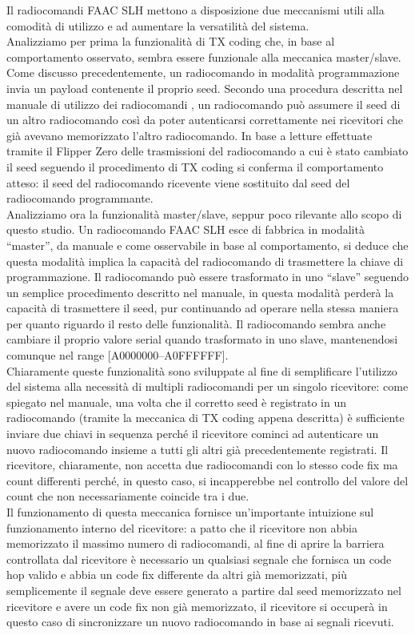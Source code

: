 Il radiocomandi FAAC SLH mettono a disposizione due meccanismi utili alla comodità di utilizzo e ad aumentare la versatilità del sistema.\\
Analizziamo per prima la funzionalità di TX coding che, in base al comportamento osservato, sembra essere funzionale alla meccanica master/slave. Come discusso precedentemente, un radiocomando in modalità programmazione invia un payload contenente il proprio seed. Secondo una procedura descritta nel manuale di utilizzo dei radiocomandi \cite{man1,man2}, un radiocomando può assumere il seed di un altro radiocomando così da poter autenticarsi correttamente nei ricevitori che già avevano memorizzato l’altro radiocomando. In base a letture effettuate tramite il Flipper Zero delle trasmissioni del radiocomando a cui è stato cambiato il seed seguendo il procedimento di TX coding si conferma il comportamento atteso: il seed del radiocomando ricevente viene sostituito dal seed del radiocomando programmante.\\
Analizziamo ora la funzionalità master/slave, seppur poco rilevante allo scopo di questo studio. Un radiocomando FAAC SLH esce di fabbrica in modalità “master”, da manuale \cite{man1} e come osservabile in base al comportamento, si deduce che questa modalità implica la capacità del radiocomando di trasmettere la chiave di programmazione. Il radiocomando può essere trasformato in uno “slave” seguendo un semplice procedimento descritto nel manuale, in questa modalità perderà la capacità di trasmettere il seed, pur continuando ad operare nella stessa maniera per quanto riguardo il resto delle funzionalità. Il radiocomando sembra anche cambiare il proprio valore serial quando trasformato in uno slave, mantenendosi comunque nel range [A0000000--A0FFFFFF].\\
Chiaramente queste funzionalità sono sviluppate al fine di semplificare l’utilizzo del sistema alla necessità di multipli radiocomandi per un singolo ricevitore: come spiegato nel manuale, una volta che il corretto seed è registrato in un radiocomando (tramite la meccanica di TX coding appena descritta) è sufficiente inviare due chiavi in sequenza perché il ricevitore cominci ad autenticare un nuovo radiocomando insieme a tutti gli altri già precedentemente registrati. Il ricevitore, chiaramente, non accetta due radiocomandi con lo stesso code fix ma count differenti perché, in questo caso, si incapperebbe nel controllo del valore del count che non necessariamente coincide tra i due.\\
Il funzionamento di questa meccanica fornisce un'importante intuizione sul funzionamento interno del ricevitore: a patto che il ricevitore non abbia memorizzato il massimo numero di radiocomandi, al fine di aprire la barriera controllata dal ricevitore è necessario un qualsiasi segnale che fornisca un code hop valido e abbia un code fix differente da altri già memorizzati, più semplicemente il segnale deve essere generato a partire dal seed memorizzato nel ricevitore e avere un code fix non già memorizzato, il ricevitore si occuperà in questo caso di sincronizzare un nuovo radiocomando in base ai segnali ricevuti.\\

